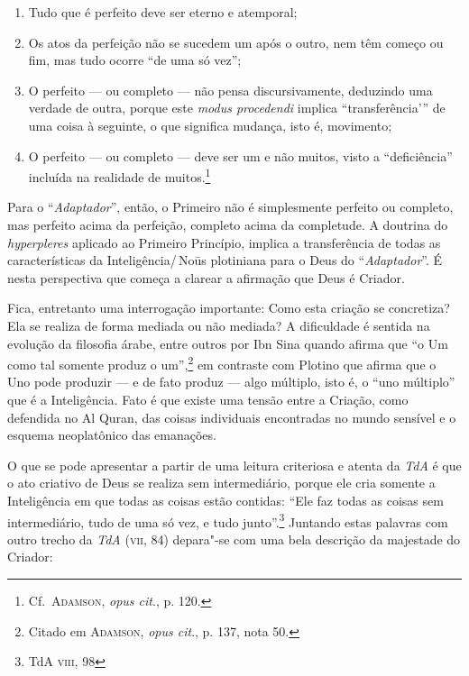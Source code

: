 \begin{enumerate}
\item Tudo que é perfeito deve ser eterno e atemporal;

\item Os atos da perfeição não se sucedem um após o outro, nem têm
começo ou fim, mas tudo ocorre “de uma só vez”;

\item O perfeito --- ou completo --- não pensa discursivamente, deduzindo
uma verdade de outra, porque este \emph{modus procedendi}
implica “transferência'” de uma coisa à seguinte, o que
significa mudança, isto é, movimento;

\item O perfeito --- ou completo --- deve ser um e não muitos, visto a
“deficiência” incluída na realidade de muitos.\footnote{
Cf.~\textsc{Adamson}, \emph{opus cit}., p. 120.}
\end{enumerate}

Para o “\emph{Adaptador}”, então, o Primeiro não é
simplesmente perfeito ou completo, mas perfeito acima da
perfeição, completo acima da completude. A doutrina do
\emph{hyperpleres} aplicado ao Primeiro Princípio, implica a
transferência de todas as características da Inteligência/\,Noūs
plotiniana para o Deus do “\emph{Adaptador}”. É nesta
perspectiva que começa a clarear a afirmação que Deus é Criador.

Fica, entretanto uma interrogação importante: Como esta
criação se concretiza? Ela se realiza de forma mediada ou não
mediada? A dificuldade é sentida na evolução da filosofia árabe,
entre outros por Ibn Sina quando afirma que “o Um como tal
somente produz o um”,\footnote{ Citado em \textsc{Adamson},
\emph{opus cit}., p. 137, nota 50.} em contraste com Plotino que afirma
que o Uno pode produzir --- e de fato produz --- algo múltiplo, isto é,  
o “uno múltiplo” que é a Inteligência. Fato é que existe uma
tensão entre a Criação, como defendida no Al Quran, das coisas
individuais encontradas no mundo sensível e o esquema
neoplatônico das emanações. 

O que se pode apresentar a partir de uma leitura criteriosa e
atenta da \emph{TdA} é que o ato criativo de Deus se realiza
sem intermediário, porque ele cria somente a Inteligência em que
todas as coisas estão contidas: “Ele faz todas as coisas sem
intermediário, tudo de uma só vez, e tudo junto”.\footnote{ TdA
\textsc{viii}, 98} Juntando estas palavras com outro trecho da
\emph{TdA} (\textsc{vii}, 84) depara"-se com uma bela descrição da
majestade do Criador:

